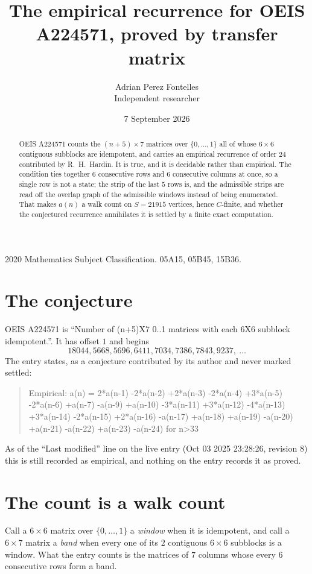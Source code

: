 \documentclass[11pt,a4paper]{article}
\title{The empirical recurrence for OEIS A224571, proved by transfer matrix}
\author{Adrian Perez Fontelles\\ \small Independent researcher}
\date{7 September 2026}
\theoremstyle{plain}
\theoremstyle{definition}
\begin{document}
\maketitle

\begin{abstract}
OEIS A224571 counts the $(n+5)\times7$ matrices over $\{0,\dots,1\}$ all of whose
$6\times6$ contiguous subblocks are idempotent, and carries an empirical recurrence of order
$24$ contributed by R.~H.~Hardin. It is true, and it is decidable rather than empirical.
The condition ties together $6$ consecutive rows and $6$ consecutive columns at once, so a
single row is not a state; the strip of the last $5$ rows is, and the admissible strips
are read off the overlap graph of the admissible windows instead of being enumerated. That
makes $a(n)$ a walk count on $S=21915$ vertices, hence $C$-finite, and whether the conjectured
recurrence annihilates it is settled by a finite exact computation.
\end{abstract}

\noindent\small 2020 Mathematics Subject Classification. 05A15, 05B45, 15B36.\normalsize

\section{The conjecture}

OEIS A224571 is ``Number of (n+5)X7 0..1 matrices with each 6X6 subblock idempotent.''. It has offset $1$ and begins
\[
18044, 5668, 5696, 6411, 7034, 7386, 7843, 9237,\ \dots
\]
The entry states, as a conjecture contributed by its author and never marked settled:
\begin{quote}
Empirical: a(n) = 2*a(n-1) -2*a(n-2) +2*a(n-3) -2*a(n-4) +3*a(n-5) -2*a(n-6) +a(n-7) -a(n-9) +a(n-10) -3*a(n-11) +3*a(n-12) -4*a(n-13) +3*a(n-14) -2*a(n-15) +2*a(n-16) -a(n-17) +a(n-18) +a(n-19) -a(n-20) +a(n-21) -a(n-22) +a(n-23) -a(n-24) for n>33
\end{quote}
As of the ``Last modified'' line on the live entry (Oct 03 2025 23:28:26, revision 8) this is still
recorded as empirical, and nothing on the entry records it as proved.

\section{The count is a walk count}

Call a $6\times6$ matrix over $\{0,\dots,1\}$ a \emph{window} when it is idempotent, and
call a $6\times7$ matrix a \emph{band} when every one of its $2$ contiguous
$6\times6$ subblocks is a window. What the entry counts is the matrices of $7$ columns
whose every $6$ consecutive rows form a band.
\end{document}
